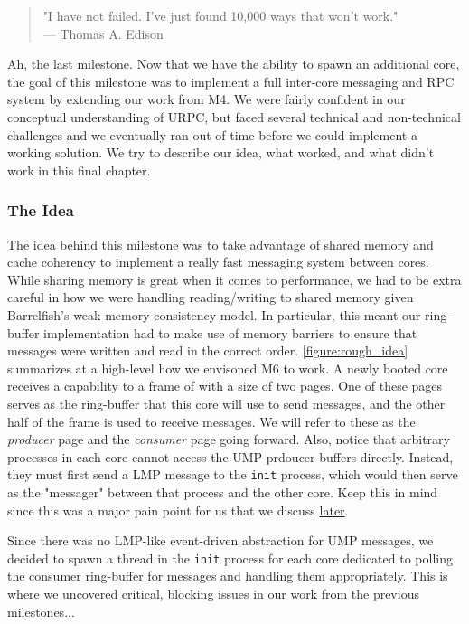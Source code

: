 \begin{quote}
"I have not failed. I've just found 10,000 ways that won't work." \\
\hspace*{\fill} — Thomas A. Edison
\end{quote}

Ah, the last milestone. Now that we have the ability to spawn an additional core, the goal of this milestone was to implement a full inter-core messaging and RPC system by extending our work from M4. We were fairly confident in our conceptual understanding of URPC, but faced several technical and non-technical challenges and we eventually ran out of time before we could implement a working solution. We try to describe our idea, what worked, and what didn't work in this final chapter.

\subsubsection*{The Idea} \label{sec:the_idea}
The idea behind this milestone was to take advantage of shared memory and cache coherency to implement a really fast messaging system between cores. While sharing memory is great when it comes to performance, we had to be extra careful in how we were handling reading/writing to shared memory given Barrelfish's weak memory consistency model. In particular, this meant our ring-buffer implementation had to make use of memory barriers to ensure that messages were written and read in the correct order. \autoref{figure:rough_idea} summarizes at a high-level how we envisoned M6 to work. A newly booted core receives a capability to a frame of with a size of two pages. One of these pages serves as the ring-buffer that this core will use to send messages, and the other half of the frame is used to receive messages. We will refer to these as the \textit{producer} page and the \textit{consumer} page going forward. Also, notice that arbitrary processes in each core cannot access the UMP prdoucer buffers directly. Instead, they must first send a LMP message to the \verb|init| process, which would then serve as the "messager" between that process and the other core. Keep this in mind since this was a major pain point for us that we discuss \hyperref[hurdles]{later}.

Since there was no LMP-like event-driven abstraction for UMP messages, we decided to spawn a thread in the \verb|init| process for each core dedicated to polling the consumer ring-buffer for messages and handling them appropriately. This is where we uncovered critical, blocking issues in our work from the previous milestones...

